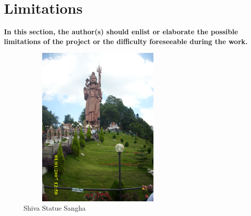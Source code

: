 \section{\bf Limitations}
{\bf\color{red}In this section, the author(s) should enlist or elaborate the possible limitations of the project or the difficulty foreseeable during the work.}
\begin{figure}[htpb]
\begin{center}
\includegraphics[height=8cm, width=8cm]{figures/sanga.JPG}
\caption{Shiva Statue Sangha}
\label{fig1.6}
\end{center}
\end{figure}
